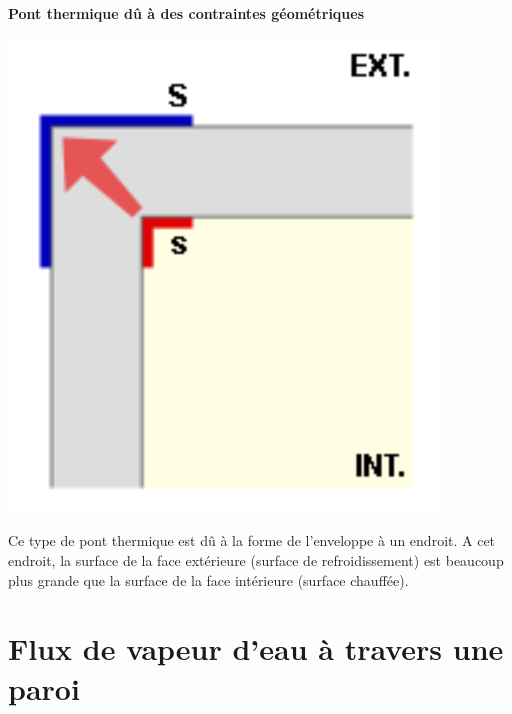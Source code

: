 \documentclass[11pt]{report}
\begin{document}
\subsubsection{Pont thermique dû à des contraintes géométriques}
\begin{minipage}{0.3\linewidth}
\centering
\includegraphics[scale=0.45]{pont2}
\end{minipage}
\begin{minipage}{0.65\linewidth}
Ce type de pont thermique est dû à la forme de l'enveloppe à un endroit. A cet endroit, la surface de la face extérieure (surface de refroidissement) est beaucoup plus grande que la surface de la face intérieure (surface chauffée).

\end{minipage}







\newpage
\chapter{Flux de vapeur d'eau à travers une paroi}
\end{document}
